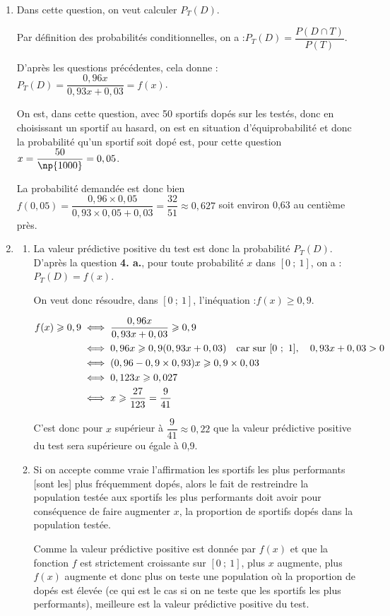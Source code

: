 \begin{enumerate}
On arrive bien à la probabilité annoncée.

		\item Dans cette question, on veut calculer $P_T(D)$.

Par définition des probabilités conditionnelles, on a :\quad $P_T(D) = \dfrac{P(D \cap T)}{P(T)}$.

D'après les questions précédentes, cela donne :\quad $P_T(D) = \dfrac{0,96x}{0,93x + 0,03} = f(x)$.

On est, dans cette question, avec 50 sportifs dopés sur les  testés, donc en choisissant un sportif au hasard, on est en situation d'équiprobabilité et donc la probabilité qu'un sportif soit dopé est, pour cette question $x = \dfrac{50}{\np{1000}} = 0,05$.

La probabilité demandée est donc bien $f(0,05) = \dfrac{0,96 \times 0,05}{0,93\times 0,05 + 0,03} = \dfrac{32}{51}\approx 0,627$ soit environ 0,63 au centième près.

		\item \begin{enumerate}
			\item La valeur prédictive positive du test est donc la probabilité $P_T(D)$. D'après la question \textbf{4. a.}, pour toute probabilité $x$ dans $ [0~;~1] $, on a :\quad $P_T(D)= f(x)$.

On veut donc résoudre, dans $ [0~;~1] $, l'inéquation :\quad $f(x) \geqslant 0,9$.

$\aligned f(x) \geqslant 0,9&\iff \dfrac{0,96x}{0,93x + 0,03 } \geqslant 0,9\\
&\iff 0,96x \geqslant 0,9 (0,93x+0,03) \quad \text{car sur } [0~;~1],\quad 0,93x + 0,03 >0\\
&\iff (0,96 - 0,9\times 0,93)x \geqslant 0,9\times 0,03\\
&\iff 0,123x \geqslant 0,027\\
&\iff x \geqslant \dfrac{27}{123}	=\dfrac{9}{41 }	\endaligned $

C'est donc pour $x$ supérieur à $ \dfrac{9}{41} \approx 0,22$ que la valeur prédictive positive du test sera supérieure ou égale à 0,9.

\item Si on accepte comme vraie l'affirmation \og les sportifs les plus performants [sont les] plus fréquemment dopés\fg{}, alors le fait de restreindre la population testée aux sportifs les plus performants doit avoir pour conséquence de faire augmenter $x$, la proportion de sportifs dopés dans la population testée.

Comme la valeur prédictive positive est donnée par $f(x)$ et que la fonction $f$ est strictement croissante sur $ [0~;~1] $, plus $x$ augmente, plus $f(x)$ augmente et donc plus on teste une population où la proportion de dopés est élevée (ce qui est le cas si on ne teste que les sportifs les plus performants), meilleure est la valeur prédictive positive du test.
		\end{enumerate}
	\end{enumerate}

\vspace{5mm}

